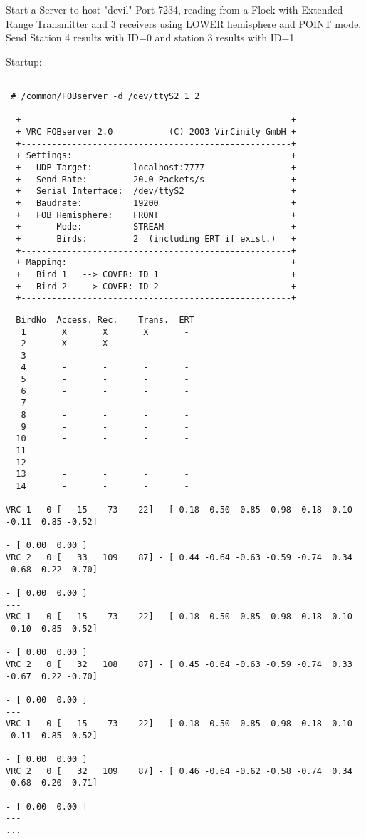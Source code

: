    Start a Server to host "devil" Port 7234, reading from a Flock with Extended
   Range Transmitter and 3 receivers using LOWER hemisphere and POINT mode. Send
   Station 4 results with ID=0 and station 3 results with ID=1

Startup:

\small \begin{verbatim}   

 # /common/FOBserver -d /dev/ttyS2 1 2

  +-----------------------------------------------------+
  + VRC FOBserver 2.0           (C) 2003 VirCinity GmbH +
  +-----------------------------------------------------+
  + Settings:                                           +
  +   UDP Target:        localhost:7777                 +
  +   Send Rate:         20.0 Packets/s                 +
  +   Serial Interface:  /dev/ttyS2                     +
  +   Baudrate:          19200                          +
  +   FOB Hemisphere:    FRONT                          +
  +       Mode:          STREAM                         +
  +       Birds:         2  (including ERT if exist.)   +
  +-----------------------------------------------------+
  + Mapping:                                            +
  +   Bird 1   --> COVER: ID 1                          +
  +   Bird 2   --> COVER: ID 2                          +
  +-----------------------------------------------------+
\end{verbatim} \normalsize
\clearpage
\small \begin{verbatim}
  BirdNo  Access. Rec.    Trans.  ERT
   1       X       X       X       -
   2       X       X       -       -
   3       -       -       -       -
   4       -       -       -       -
   5       -       -       -       -
   6       -       -       -       -
   7       -       -       -       -
   8       -       -       -       -
   9       -       -       -       -
  10       -       -       -       -
  11       -       -       -       -
  12       -       -       -       -
  13       -       -       -       -
  14       -       -       -       -

VRC 1   0 [   15   -73    22] - [-0.18  0.50  0.85  0.98  0.18  0.10 -0.11  0.85 -0.52] 
                                                                       - [ 0.00  0.00 ]
VRC 2   0 [   33   109    87] - [ 0.44 -0.64 -0.63 -0.59 -0.74  0.34 -0.68  0.22 -0.70] 
                                                                       - [ 0.00  0.00 ]
---
VRC 1   0 [   15   -73    22] - [-0.18  0.50  0.85  0.98  0.18  0.10 -0.10  0.85 -0.52] 
                                                                       - [ 0.00  0.00 ]
VRC 2   0 [   32   108    87] - [ 0.45 -0.64 -0.63 -0.59 -0.74  0.33 -0.67  0.22 -0.70] 
                                                                       - [ 0.00  0.00 ]
---
VRC 1   0 [   15   -73    22] - [-0.18  0.50  0.85  0.98  0.18  0.10 -0.11  0.85 -0.52] 
                                                                       - [ 0.00  0.00 ]
VRC 2   0 [   32   109    87] - [ 0.46 -0.64 -0.62 -0.58 -0.74  0.34 -0.68  0.20 -0.71] 
                                                                       - [ 0.00  0.00 ]
---
...
\end{verbatim} \normalsize
\clearpage


